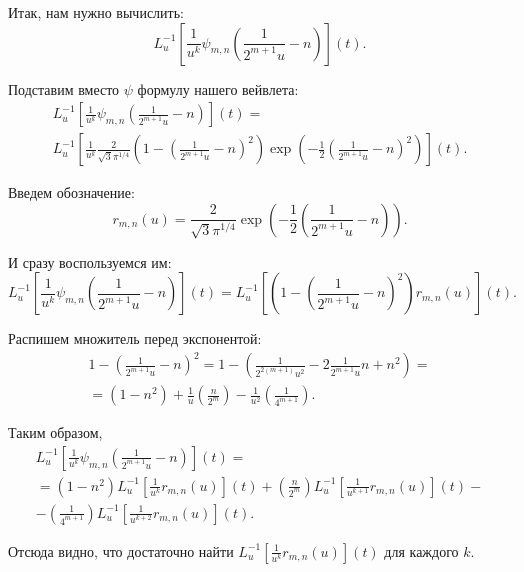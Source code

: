 \documentclass[../paper.tex]{subfiles}
\begin{document}
Итак, нам нужно вычислить:
\[
    L^{-1}_u \left[ \frac{1}{u^k} \psi_{m,n} \left( \frac{1}{2^{m+1} u} - n \right) \right] (t).
\]

Подставим вместо $\psi$ формулу нашего вейвлета:
\begin{multline*}
    L^{-1}_u \left[ \frac{1}{u^k} \psi_{m,n} \left( \frac{1}{2^{m+1} u} - n \right) \right] (t) =
\\%
    L^{-1}_u \left[ \frac{1}{u^k} \frac{2}{\sqrt{3} \pi^{1/4} } 
    \left( 1 - \left( \frac{1}{2^{m+1} u} - n \right)^2 \right) 
    \exp \left( -\frac{1}{2} \left( \frac{1}{2^{m+1}u} - n \right)^2  \right)
    \right](t).
\end{multline*}

Введем обозначение:
\[
    r_{m,n}(u) = \frac{2}{\sqrt{3} \pi^{1/4}} \exp \left( -\frac{1}{2} \left( \frac{1}{2^{m+1}u} - n \right)  \right) 
.\]

И сразу воспользуемся им:
\[
	L^{-1}_u \left[ \frac{1}{u^k} \psi_{m,n} \left( \frac{1}{2^{m+1} u} - n \right) \right] (t)
	= L^{-1}_u \left[ \left( 1 - \left( \frac{1}{2^{m+1} u} - n \right)^2 \right) r_{m,n}(u) \right](t).
\]

Распишем множитель перед экспонентой:
\begin{multline*}
    1 - \left( \frac{1}{2^{m+1} u } - n \right)^2 =
    1 - \left( \frac{1}{2^{2(m+1)} u^2} - 2 \frac{1}{2^{m+1} u } n + n^2 \right) =
\\=%
    \left( 1 - n^2 \right) + \frac{1}{u} \left(\frac{n}{2^m}\right) - \frac{1}{u^2} \left(\frac{1}{4^{m+1}}\right)
.\end{multline*}


Таким образом,
\begin{multline}\label{eq:invlap_gen}
    L^{-1}_u \left[ \frac{1}{u^k} \psi_{m,n} \left( \frac{1}{2^{m+1} u} - n \right) \right] (t)
=\\=
    \left( 1 - n^2 \right)  L^{-1}_u \left[ \frac{1}{u^k} r_{m,n}(u) \right](t) +
    \left( \frac{n}{2^m} \right)  L^{-1}_u \left[ \frac{1}{u^{k+1}} r_{m,n}(u) \right](t)
-\\-
    \left( \frac{1}{4^{m+1}} \right)  L^{-1}_u \left[ \frac{1}{u^{k+2}} r_{m,n}(u) \right](t)
.\end{multline}

Отсюда видно, что достаточно найти $L^{-1}_u [\frac{1}{u^k} r_{m,n}(u)](t)$ для каждого $k$.
\end{document}
